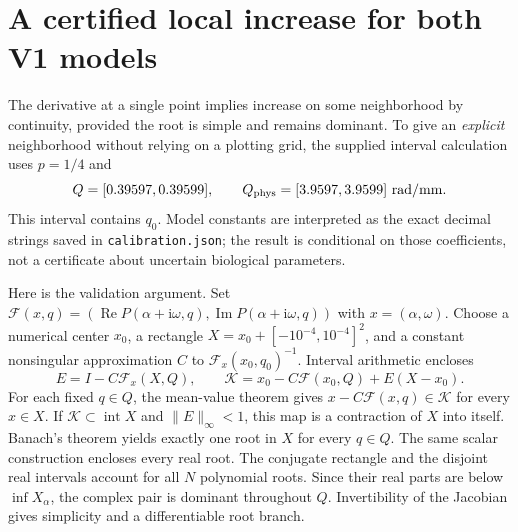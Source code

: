 \documentclass[11pt]{article}
\newcommand{\ii}{\mathrm i}
\newcommand{\Rea}{\operatorname{Re}}
\newcommand{\Ima}{\operatorname{Im}}
\begin{document}
\newpage
\section{A certified local increase for both V1 models}\label{sec:certificate}
The derivative at a single point implies increase on some neighborhood by
continuity, provided the root is simple and remains dominant. To give an
\emph{explicit} neighborhood without relying on a plotting grid, the supplied
interval calculation uses $p=1/4$ and
\begin{equation}
 Q=[0.39597,0.39599],\qquad Q_{\rm phys}=[3.9597,3.9599]\ \mathrm{rad/mm}.
 \label{eq:Q}
\end{equation}
This interval contains $q_0$. Model constants are interpreted as the exact
decimal strings saved in \texttt{calibration.json}; the result is conditional
on those coefficients, not a certificate about uncertain biological parameters.

Here is the validation argument. Set
$\mathcal F(x,q)=(\Rea P(\alpha+\ii\omega,q),\Ima P(\alpha+\ii\omega,q))$
with $x=(\alpha,\omega)$. Choose a numerical center $x_0$, a rectangle
$X=x_0+[-10^{-4},10^{-4}]^2$, and a constant nonsingular approximation
$C$ to $\mathcal F_x(x_0,q_0)^{-1}$. Interval arithmetic encloses
\begin{equation}
 E=I-C\mathcal F_x(X,Q),\qquad
 \mathcal K=x_0-C\mathcal F(x_0,Q)+E(X-x_0).
 \label{eq:krawczyk}
\end{equation}
For each fixed $q\in Q$, the mean-value theorem gives
$x-C\mathcal F(x,q)\in\mathcal K$ for every $x\in X$.
If $\mathcal K\subset\operatorname{int}X$ and $\|E\|_\infty<1$, this map
is a contraction of $X$ into itself. Banach's theorem yields exactly one root
in $X$ for every $q\in Q$. The same scalar construction encloses every real
root. The conjugate rectangle and the disjoint real intervals account for all
$N$ polynomial roots. Since their real parts are below $\inf X_\alpha$, the
complex pair is dominant throughout $Q$. Invertibility of the Jacobian gives
simplicity and a differentiable root branch.
\end{document}
